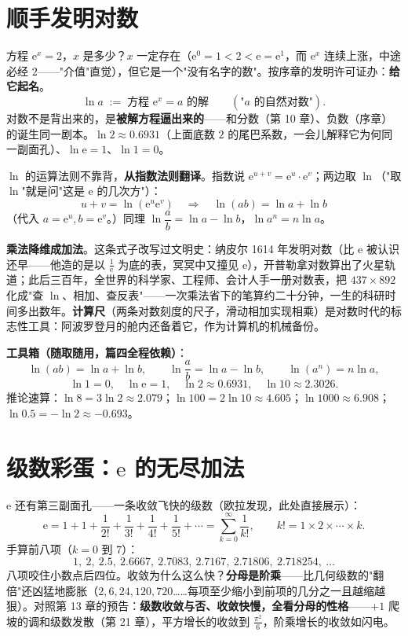 \section{顺手发明对数}

方程 $\mathrm{e}^x = 2$，$x$ 是多少？$x$ 一定存在（$\mathrm{e}^0 = 1 < 2 < \mathrm{e} = \mathrm{e}^1$，而 $\mathrm{e}^x$ 连续上涨，中途必经 $2$——"介值"直觉），但它是一个"没有名字的数"。按序章的发明许可证办：\textbf{给它起名}。
\[
\ln a \;:=\; \text{方程 } \mathrm{e}^x = a \text{ 的解} \qquad (\text{"}a\text{ 的自然对数"}) .
\]
对数不是背出来的，是\textbf{被解方程逼出来的}——和分数（第 10 章）、负数（序章）的诞生同一剧本。$\ln 2 \approx 0.6931$（上面底数 $2$ 的尾巴系数，一会儿解释它为何同一副面孔）、$\ln \mathrm{e} = 1$、$\ln 1 = 0$。

$\ln$ 的运算法则不靠背，\textbf{从指数法则翻译}。指数说 $\mathrm{e}^{u+v} = \mathrm{e}^u\cdot\mathrm{e}^v$；两边取 $\ln$（"取 $\ln$"就是问"这是 $\mathrm{e}$ 的几次方"）：
\[
u + v = \ln\left(\mathrm{e}^u\mathrm{e}^v\right) \quad\Longrightarrow\quad \boxed{\ln(ab) = \ln a + \ln b}
\]
（代入 $a = \mathrm{e}^u, b = \mathrm{e}^v$。）同理 $\ln\dfrac ab = \ln a - \ln b$，$\ln a^n = n\ln a$。

\textbf{乘法降维成加法}。这条式子改写过文明史：纳皮尔 1614 年发明对数（比 $\mathrm{e}$ 被认识还早——他造的是以 $\tfrac{1}{\mathrm{e}}$ 为底的表，冥冥中又撞见 $\mathrm{e}$），开普勒拿对数算出了火星轨道；此后三百年，全世界的科学家、工程师、会计人手一册对数表，把 $437\times892$ 化成"查 $\ln$、相加、查反表"——一次乘法省下的笔算约二十分钟，一生的科研时间多出数年。\textbf{计算尺}（两条对数刻度的尺子，滑动相加实现相乘）是对数时代的标志性工具：阿波罗登月的舱内还备着它，作为计算机的机械备份。

\begin{gongju}
\textbf{工具箱（随取随用，篇四全程依赖）}：
\[
\ln(ab) = \ln a + \ln b,\qquad \ln\frac ab = \ln a - \ln b,\qquad \ln(a^n) = n\ln a,
\]
\[
\ln 1 = 0,\quad \ln \mathrm{e} = 1,\quad \ln 2 \approx 0.6931,\quad \ln 10 \approx 2.3026 .
\]
推论速算：$\ln 8 = 3\ln 2 \approx 2.079$；$\ln 100 = 2\ln10 \approx 4.605$；$\ln 1000 \approx 6.908$；$\ln 0.5 = -\ln 2 \approx -0.693$。
\end{gongju}

\section{级数彩蛋：$\mathrm{e}$ 的无尽加法}

$\mathrm{e}$ 还有第三副面孔——一条收敛飞快的级数（欧拉发现，此处直接展示）：
\[
\mathrm{e} = 1 + 1 + \frac{1}{2!} + \frac{1}{3!} + \frac{1}{4!} + \frac{1}{5!} + \cdots = \sum_{k=0}^{\infty}\frac{1}{k!},
\qquad k! = 1\times2\times\cdots\times k .
\]
手算前八项（$k = 0$ 到 $7$）：
\[
1,\ 2,\ 2.5,\ 2.6667,\ 2.7083,\ 2.7167,\ 2.71806,\ 2.718254,\ \dots
\]
八项咬住小数点后四位。收敛为什么这么快？\textbf{分母是阶乘}——比几何级数的"翻倍"还凶猛地膨胀（$2, 6, 24, 120, 720$……每项至少缩小到前项的几分之一且越缩越狠）。对照第 13 章的预告：\textbf{级数收敛与否、收敛快慢，全看分母的性格}——$+1$ 爬坡的调和级数发散（第 21 章），平方增长的收敛到 $\tfrac{\pi^2}6$，阶乘增长的收敛如闪电。

